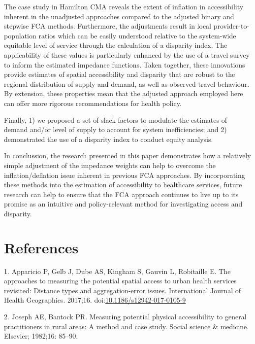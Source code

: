 \documentclass[10pt,letterpaper]{article}
\begin{document}
The case study in Hamilton CMA reveals the extent of inflation in
accessibility inherent in the unadjusted approaches compared to the
adjusted binary and stepwise FCA methods. Furthermore, the adjustments
result in local provider-to-population ratios which can be easily
understood relative to the system-wide equitable level of service
through the calculation of a disparity index. The applicability of these
values is particularly enhanced by the use of a travel survey to inform
the estimated impedance functions. Taken together, these innovations
provide estimates of spatial accessibility and disparity that are robust
to the regional distribution of supply and demand, as well as observed
travel behaviour. By extension, these properties mean that the adjusted
approach employed here can offer more rigorous recommendations for
health policy.

Finally, 1) we proposed a set of slack factors to modulate the estimates
of demand and/or level of supply to account for system inefficiencies;
and 2) demonstrated the use of a disparity index to conduct equity
analysis.

In conclussion, the research presented in this paper demonstrates how a
relatively simple adjustment of the impedance weights can help to
overcome the inflation/deflation issue inherent in previous FCA
approaches. By incorporating these methods into the estimation of
accessibility to healthcare services, future research can help to ensure
that the FCA approach continues to live up to its promise as an
intuitive and policy-relevant method for investigating access and
disparity.

\section*{References}\label{references}

\hypertarget{refs}{}
\hypertarget{ref-Apparicio2017}{}
1. Apparicio P, Gelb J, Dube AS, Kingham S, Gauvin L, Robitaille E. The
approaches to measuring the potential spatial access to urban health
services revisited: Distance types and aggregation-error issues.
International Journal of Health Geographics. 2017;16.
doi:\href{https://doi.org/10.1186/s12942-017-0105-9}{10.1186/s12942-017-0105-9}

\hypertarget{ref-Joseph1982}{}
2. Joseph AE, Bantock PR. Measuring potential physical accessibility to
general practitioners in rural areas: A method and case study. Social
science \& medicine. Elsevier; 1982;16: 85--90.
\end{document}

